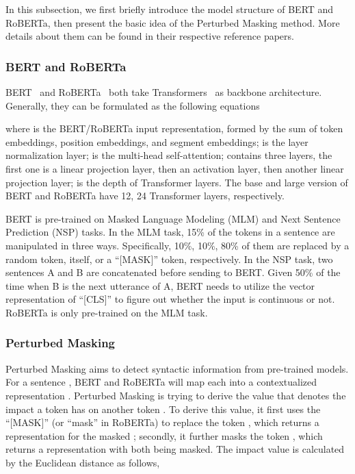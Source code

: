 \documentclass[11pt]{article}
\begin{document}
In this subsection, we first briefly introduce the model structure of BERT and RoBERTa, then present the basic idea of the Perturbed Masking method. More details about them can be found in their respective reference papers.


\subsubsection{BERT and RoBERTa}
BERT~\citep{DBLP:conf/naacl/DevlinCLT19} and RoBERTa~\citep{DBLP:journals/corr/abs-1907-11692} both take Transformers~\citep{DBLP:conf/nips/VaswaniSPUJGKP17} as backbone architecture. Generally, they can be formulated as the following equations

where  is the BERT/RoBERTa input representation,  formed by the sum of token embeddings, position embeddings, and segment embeddings;  is the layer normalization layer;  is the multi-head self-attention;  contains three layers, the first one is a linear projection layer, then an activation layer, then another linear projection layer;  is the depth of Transformer layers. The base and large version of BERT and RoBERTa have 12, 24 Transformer layers, respectively.


BERT is pre-trained on Masked Language Modeling (MLM) and Next Sentence Prediction (NSP) tasks. In the MLM task, 15\% of the tokens in a sentence are manipulated in three ways. Specifically, 10\%, 10\%, 80\% of them are replaced by a random token, itself, or a ``[MASK]'' token, respectively. In the NSP task, two sentences A and B are concatenated before sending to BERT. Given 50\% of the time when B is the next utterance of A, BERT needs to utilize the vector representation of ``[CLS]'' to figure out whether the input is continuous or not. RoBERTa is only pre-trained on the MLM task.





\subsubsection{Perturbed Masking}
Perturbed Masking aims to detect syntactic information from pre-trained  models.
For a sentence , BERT and RoBERTa will map each  into a contextualized representation . Perturbed Masking is trying to derive the value  that denotes the impact a token  has on another token . To derive this value, it first uses the ``[MASK]'' (or ``mask'' in RoBERTa) to replace the token , which returns a representation  for the masked ; secondly, it further masks the token , which returns a representation  with both  being masked. The impact value  is calculated by the Euclidean distance as follows,
\end{document}
